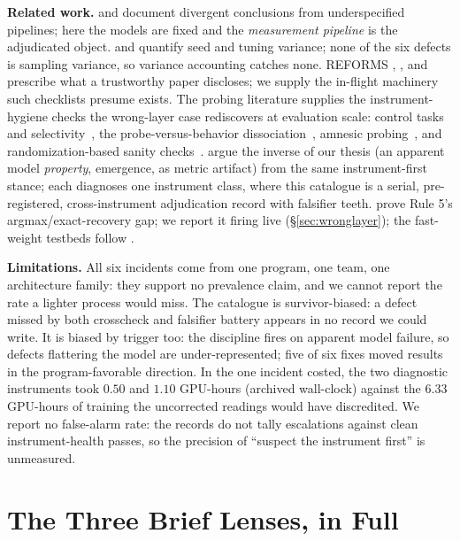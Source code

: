 \documentclass{article}
\begin{document}
 \textbf{Related work.} \citet{silberzahn2018many} and
\citet{damour2020underspecification} document divergent conclusions
from underspecified pipelines; here the models are fixed and
the \emph{measurement pipeline} is the adjudicated object.
\citet{henderson2018deep} and
\citet{bouthillier2021accounting} quantify seed and tuning variance;
none of the six defects is sampling variance, so variance
accounting catches none. REFORMS
\citep{kapoor2023reforms}, \citet{sculley2018winners}, and
\citet{lipton2018troubling} prescribe what a trustworthy paper
discloses; we supply the in-flight machinery such checklists
presume exists. The probing literature supplies the
instrument-hygiene checks the wrong-layer case rediscovers at
evaluation scale: control tasks and
selectivity~\citep{hewitt2019control}, the probe-versus-behavior
dissociation~\citep{belinkov2022probing}, amnesic
probing~\citep{elazar2021amnesic}, and randomization-based sanity
checks~\citep{adebayo2018sanity}. \citet{schaeffer2023emergent}
argue the inverse of our thesis (an apparent model \emph{property},
emergence, as metric artifact) from the same
instrument-first stance; each diagnoses one instrument
class, where this catalogue is a serial, pre-registered,
cross-instrument adjudication record with falsifier teeth.
\citet{nichani2025factual} prove Rule 5's argmax/exact-recovery gap;
we report it firing live (\S\ref{sec:wronglayer}); the fast-weight
testbeds follow \citet{schlag2021linear}.

 \textbf{Limitations.} All six incidents come from one program, one
team, one architecture family: they support no prevalence claim, and
we cannot report the rate a lighter process would miss.
The catalogue is survivor-biased: a defect missed by both crosscheck
and falsifier battery appears in no record we could write. It is
biased by trigger too: the discipline fires on apparent model
failure, so defects flattering the model are under-represented; five
of six fixes moved results in the program-favorable direction. In the
one incident costed, the two diagnostic instruments took $0.50$ and
$1.10$ GPU-hours (archived wall-clock) against the $6.33$ GPU-hours
of training the uncorrected readings would have discredited. We
report no false-alarm rate: the records do not tally escalations
against clean instrument-health passes, so the precision of
``suspect the instrument first'' is unmeasured.





\appendix
\section{The Three Brief Lenses, in Full}
\label{app:threelenses}
\end{document}
